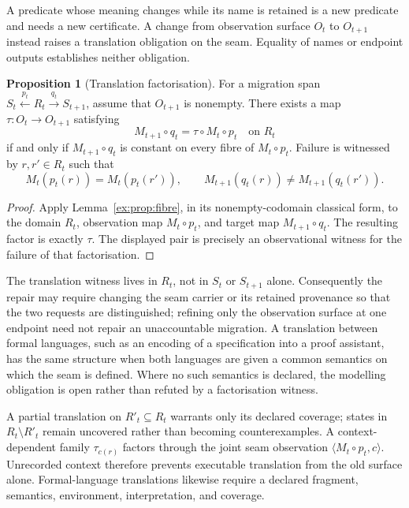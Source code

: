 \documentclass[11pt]{article}
\theoremstyle{definition}
\newtheorem{proposition}{Proposition}[section]
\begin{document}
A predicate whose meaning changes while its name is retained is a new predicate and needs a new certificate. A change from observation surface $O_t$ to $O_{t+1}$ instead raises a translation obligation on the seam. Equality of names or endpoint outputs establishes neither obligation.

\begin{proposition}[Translation factorisation]\label{ex:prop:translation-factorisation}
For a migration span $S_t\xleftarrow{p_t}R_t\xrightarrow{q_t}S_{t+1}$, assume that $O_{t+1}$ is nonempty. There exists a map $\tau:O_t\to O_{t+1}$ satisfying
\[
M_{t+1}\circ q_t=\tau\circ M_t\circ p_t
\quad\text{on }R_t
\]
if and only if $M_{t+1}\circ q_t$ is constant on every fibre of $M_t\circ p_t$. Failure is witnessed by $r,r'\in R_t$ such that
\[
M_t(p_t(r))=M_t(p_t(r')),
\qquad
M_{t+1}(q_t(r))\neq M_{t+1}(q_t(r')).
\]
\end{proposition}

\begin{proof}
Apply Lemma~\ref{ex:prop:fibre}, in its nonempty-codomain classical form, to the domain $R_t$, observation map $M_t\circ p_t$, and target map $M_{t+1}\circ q_t$. The resulting factor is exactly $\tau$. The displayed pair is precisely an observational witness for the failure of that factorisation.
\end{proof}

The translation witness lives in $R_t$, not in $S_t$ or $S_{t+1}$ alone. Consequently the repair may require changing the seam carrier or its retained provenance so that the two requests are distinguished; refining only the observation surface at one endpoint need not repair an unaccountable migration. A translation between formal languages, such as an encoding of a specification into a proof assistant, has the same structure when both languages are given a common semantics on which the seam is defined. Where no such semantics is declared, the modelling obligation is open rather than refuted by a factorisation witness.

A partial translation on $R'_t\subseteq R_t$ warrants only its declared coverage; states in $R_t\setminus R'_t$ remain uncovered rather than becoming counterexamples. A context-dependent family $\tau_{c(r)}$ factors through the joint seam observation $\langle M_t\circ p_t,c\rangle$. Unrecorded context therefore prevents executable translation from the old surface alone. Formal-language translations likewise require a declared fragment, semantics, environment, interpretation, and coverage.
\end{document}
